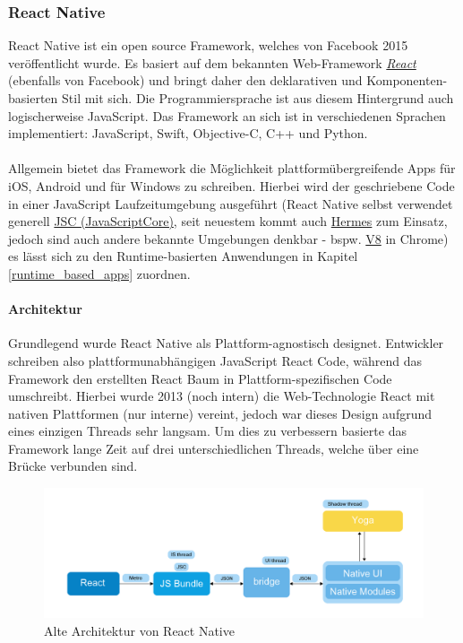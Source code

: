\subsubsection{React Native}
\label{react-native}
React Native ist ein open source Framework, welches von Facebook 2015 veröffentlicht wurde. 
Es basiert auf dem bekannten Web-Framework \href{https://reactjs.org/}{\textit{React}} (ebenfalls von Facebook) und bringt daher den deklarativen und Komponenten-basierten Stil mit sich. 
Die Programmiersprache ist aus diesem Hintergrund auch logischerweise JavaScript.
Das Framework an sich ist in verschiedenen Sprachen implementiert: JavaScript, Swift, Objective-C, C++ und Python.\\
\\
Allgemein bietet das Framework die Möglichkeit plattformübergreifende Apps für iOS, Android und für Windows zu schreiben. Hierbei wird der geschriebene Code in einer JavaScript Laufzeitumgebung ausgeführt (React Native selbst verwendet generell \href{https://trac.webkit.org/wiki/JavaScriptCore}{JSC (JavaScriptCore)}, seit neuestem kommt auch \href{https://hermesengine.dev/}{Hermes} zum Einsatz, jedoch sind auch andere bekannte Umgebungen denkbar - bspw. \href{https://v8.dev/}{V8} in Chrome) es lässt sich zu den Runtime-basierten Anwendungen in Kapitel \ref{runtime_based_apps} zuordnen. \cite{reactnative2021}\\
\paragraph{Architektur}
Grundlegend wurde React Native als Plattform-agnostisch designet. Entwickler schreiben also plattformunabhängigen JavaScript React Code, während das Framework den erstellten React Baum in Plattform-spezifischen Code umschreibt. Hierbei wurde 2013 (noch intern) die Web-Technologie React mit nativen Plattformen (nur interne) vereint, jedoch war dieses Design aufgrund eines einzigen Threads sehr langsam. Um dies zu verbessern basierte das Framework lange Zeit auf drei unterschiedlichen Threads, welche über eine Brücke verbunden sind.

\begin{figure}[h]
	\begin{center}
		\includegraphics[scale=0.4]{Theoretische_Grundlagen/images/reactnative_architecture_old.png}
	\end{center}
	\caption{Alte Architektur von React Native \protect \footnotemark}
	\label{fig:reactnative_architecture_old}
\end{figure}

